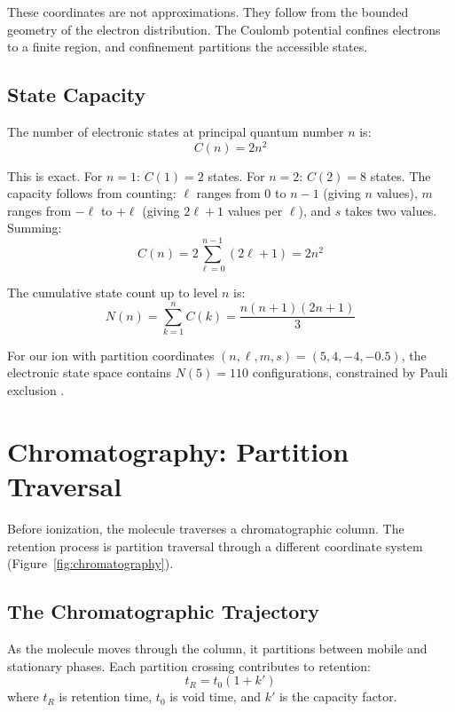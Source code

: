 \documentclass[twocolumn,10pt]{article}
\theoremstyle{remark}
\begin{document}
These coordinates are not approximations. They follow from the bounded geometry of the electron distribution. The Coulomb potential confines electrons to a finite region, and confinement partitions the accessible states.

\subsection{State Capacity}

The number of electronic states at principal quantum number $n$ is:
\begin{equation}
C(n) = 2n^2
\end{equation}

This is exact. For $n = 1$: $C(1) = 2$ states. For $n = 2$: $C(2) = 8$ states. The capacity follows from counting: $\ell$ ranges from 0 to $n-1$ (giving $n$ values), $m$ ranges from $-\ell$ to $+\ell$ (giving $2\ell + 1$ values per $\ell$), and $s$ takes two values. Summing:
\begin{equation}
C(n) = 2 \sum_{\ell=0}^{n-1} (2\ell + 1) = 2n^2
\end{equation}

The cumulative state count up to level $n$ is:
\begin{equation}
N(n) = \sum_{k=1}^{n} C(k) = \frac{n(n+1)(2n+1)}{3}
\end{equation}

For our ion with partition coordinates $(n, \ell, m, s) = (5, 4, -4, -0.5)$, the electronic state space contains $N(5) = 110$ configurations, constrained by Pauli exclusion \cite{pauli1925zusammenhang,fermi1926quantelung}.




\section{Chromatography: Partition Traversal}
\label{sec:chromatography}

Before ionization, the molecule traverses a chromatographic column. The retention process is partition traversal through a different coordinate system (Figure~\ref{fig:chromatography}).

\subsection{The Chromatographic Trajectory}

As the molecule moves through the column, it partitions between mobile and stationary phases. Each partition crossing contributes to retention:
\begin{equation}
t_R = t_0 \left(1 + k'\right)
\end{equation}
where $t_R$ is retention time, $t_0$ is void time, and $k'$ is the capacity factor.
\end{document}
